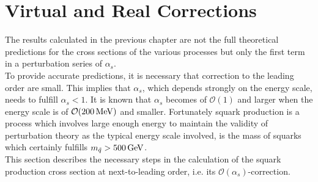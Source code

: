 \section{Virtual and Real Corrections}\label{sec:VirtRealCorr}
The results calculated in the previous chapter are not the full theoretical predictions for the cross sections of the various processes but only the first term in a perturbation series of $\alpha_s$.\\
To provide accurate predictions, it is necessary that correction to the leading order are small. This implies that $\alpha_s$, which depends strongly on the energy scale, needs to fulfill $\alpha_s < 1$. It is known that $\alpha_s$ becomes of $\mathcal{O}(1)$ and larger when the energy scale is of $\mathcal{O}(\unit[200]{MeV})$ and smaller.\cite{dissertori2003quantum} Fortunately squark production is a process which involves large enough energy to maintain the validity of perturbation theory as the typical energy scale involved, is the mass of squarks which certainly fulfills $m_{\tilde{q}} > \unit[500]{GeV}$.\\
This section describes the necessary steps in the calculation of the squark production cross section at next-to-leading order, i.e. its $\mathcal{O}(\alpha_s)$-correction.\\


